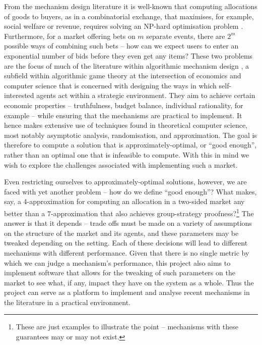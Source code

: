\documentclass[10pt,a4paper]{article}
\theoremstyle{plain}
\theoremstyle{definition}
\begin{document}
	From the mechanism design literature it is well-known that computing
	allocations of goods to buyers, as in a combinatorial exchange, that
	maximises, for example, social welfare or revenue, requires solving an
	NP-hard optimisation problem \cite{VCGNPhard}. Furthermore, for a market
	offering bets on $m$ separate events, there are $2^m$ possible ways of
	combining such bets -- how can we expect users to enter an exponential
	number of bids before they even get any items? These two problems are the
	focus of much of the literature within algorithmic mechanism design
	\cite{Nisan2001}, a subfield within algorithmic game theory at the
	intersection of economics and computer science that is concerned with
	designing the ways in which self-interested agents act within a strategic
	environment. They aim to achieve certain economic properties --
	truthfulness, budget balance, individual rationality, for example -- while
	ensuring that the mechanisms are practical to implement. It hence makes
	extensive use of techniques found in theoretical computer science, most
	notably asymptotic analysis, randomisation, and approximation. The goal is
	therefore to compute a solution that is approximately-optimal, or ``good
	enough'', rather than an optimal one that is infeasible to compute. With
	this in mind we wish to explore the challenges associated with implementing
	such a market.

	Even restricting ourselves to approximately-optimal solutions, however, we
	are faced with yet another problem -- how do we define ``good enough''?
	What makes, say, a 4-approximation for computing an allocation in a
	two-sided market any better than a 7-approximation that also achieves
	group-strategy proofness?\footnote{These are just examples to illustrate
	the point -- mechanisms with these guarantees may or may not exist.} The
	answer is that it depends -- trade offs must be made on a variety of
	assumptions on the structure of the market and its agents, and these
	parameters may be tweaked depending on the setting. Each of these decisions
	will lead to different mechanisms with different performance. Given that
	there is no single metric by which we can judge a mechanism's performance,
	this project also aims to implement software that allows for the tweaking
	of such parameters on the market to see what, if any, impact they have on
	the system as a whole. Thus the project can serve as a platform to
	implement and analyse recent mechanisms in the literature in a practical
	environment.
\end{document}
